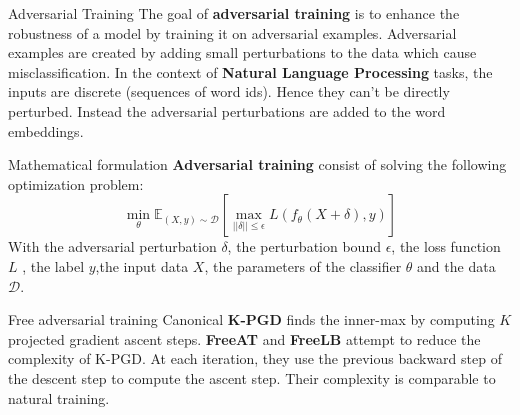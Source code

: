 \documentclass[final]{beamer}
\newlength{\onecolwid}
\begin{document}
\begin{frame}
\begin{columns}[t]
\begin{column}{\onecolwid}



\begin{exampleblock}{Adversarial Training}
The goal of \textbf{adversarial training} is to enhance the robustness of a model by training it on adversarial examples. Adversarial examples are created by adding small perturbations to the data which cause misclassification.
In the context of \textbf{Natural Language Processing} tasks, the inputs are discrete (sequences of word ids). Hence they can't be directly perturbed. Instead the adversarial perturbations are added to the word embeddings.

\end{exampleblock}

\begin{exampleblock}{Mathematical formulation}
\textbf{Adversarial training} consist of solving the following optimization problem:
$$\min_\theta \mathbb{E}_{(X,y)\sim \mathcal{D}}\left[\max_{||\delta||\leq\epsilon}L(f_\theta(X+\delta),y)\right]$$
With the adversarial perturbation $\delta$, the perturbation bound $\epsilon$, the loss function $L$ ,  the label $y$,the input data $X$, the parameters of the classifier $\theta$  and the data $\mathcal{D}$.
\end{exampleblock} 


\begin{exampleblock}{Free adversarial training}
Canonical \textbf{K-PGD} finds the inner-max by computing $K$ projected gradient ascent steps. 
\textbf{FreeAT}\cite{shafahi2019freeat} and \textbf{FreeLB}\cite{zhu2019freelb} attempt to reduce the complexity of K-PGD\cite{madry2017towards}. At each iteration, they use the previous backward step of the descent step to compute the ascent step. Their complexity is comparable to natural training.
\end{exampleblock}


\end{column}
\end{columns}
\end{frame}
\end{document}

